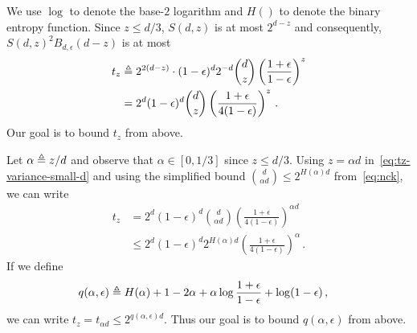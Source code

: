 
  We use $\log$ to denote the base-$2$ logarithm and $H()$ to denote the binary entropy function. 
  Since $z \leq d/3$, $S(d,z)$ is at most $2^{d-z}$ and consequently, 
  $S(d, z)^2 B_{d, \epsilon}(d-z)$ is at most
  \begin{align}\label{eq:tz-variance-small-d}
  t_z&\triangleq 2^{2(d-z)} \cdot (1-\epsilon)^d 2^{-d} {d \choose z}  \left(\frac{1+\epsilon}{1-\epsilon}\right)^{z} \nonumber \\
  &= 2^d(1-\epsilon)^d {d \choose z} \left(\frac{1+\epsilon}{4(1-\epsilon)}\right)^{z}\,.
  \end{align}
  Our goal is to bound $t_z$ from above. 

  Let $\alpha \triangleq z/d$ and observe that $\alpha \in [0, 1/3]$ since $z \leq d/3$.
  Using $z = \alpha d$ in~\eqref{eq:tz-variance-small-d} and 
  using the simplified bound $\binom{d}{\alpha d} \leq 2^{H(\alpha)d}$ from~\eqref{eq:nck}, 
  we can write
  \begin{align*}
  t_z
  &= 2^{d}(1-\epsilon)^d {d \choose \alpha d} \left(\frac{1+\epsilon}{4(1-\epsilon)}\right)^{\alpha d} \\
  &\leq 2^d
  (1-\epsilon)^d 
  2^{H(\alpha)d} 
  \left(\frac{1+\epsilon}{4(1-\epsilon)}\right)^{\alpha}
  \,.
  \end{align*}
  If we define 
  \begin{align*}
  q(\alpha, \epsilon)
  &\triangleq H(\alpha)+1-2\alpha+ \alpha \log \frac{1+\epsilon}{1-\epsilon}+\log(1-\epsilon)
  \,,
  \end{align*}
  we can write $t_z = t_{\alpha d} \leq 2^{q(\alpha, \epsilon)d}$. 
  Thus our goal is to bound $q(\alpha, \epsilon)$ from above. 

